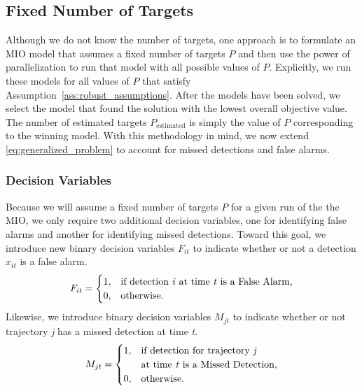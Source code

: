 \subsection{Fixed Number of Targets}
Although we do not know the number of targets, one approach is to formulate an MIO model that assumes a fixed number of targets $P$ and then use the power of parallelization to run that model with all possible values of $P$. Explicitly, we run these models for all values of $P$ that satisfy Assumption~\ref{ass:robust_assumptions}. After the models have been solved, we select the model that found the solution with the lowest overall objective value. The number of estimated targets $P_{\text{estimated}}$ is simply the value of $P$ corresponding to the winning model. With this methodology in mind, we now extend \eqref{eq:generalized_problem} to account for missed detections and false alarms. 

\subsubsection{Decision Variables}
Because we will assume a fixed number of targets $P$ for a given run of the the MIO, we only require two additional decision variables, one for identifying false alarms and another for identifying missed detections. Toward this goal, we introduce new binary decision variables $F_{it}$ to indicate whether or not a detection $x_{it}$ is a false alarm. 
\[F_{it} = 
\begin{cases}
1, & \text{if detection \textit{i} at time \textit{t} is a False Alarm,}\\
0, & \text{otherwise.}
\end{cases}\]
Likewise, we introduce binary decision variables $M_{jt}$ to indicate whether or not trajectory \textit{j} has a missed detection at time \textit{t}.
\[M_{jt} =
\begin{cases}
1, & \text{if detection for trajectory \textit{j}}\\
   &\text{at time \textit{t} is a Missed Detection,}\\
0, & \text{otherwise.}
\end{cases}\]

